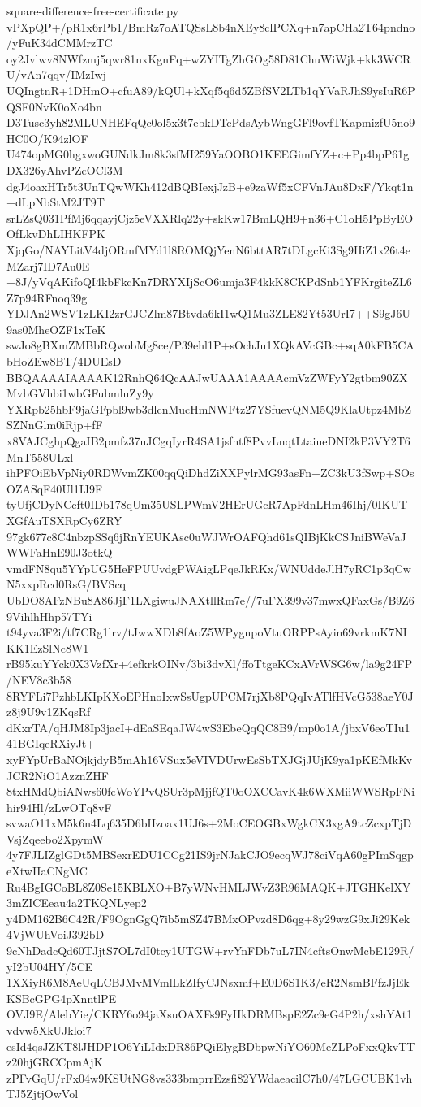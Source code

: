 \documentclass[11pt]{article}
\theoremstyle{definition}
\theoremstyle{remark}
\begin{document}
\begin{filecontents*}[overwrite]{square-difference-free-certificate.py}
vPXpQP+/pR1x6rPb1/BmRz7oATQSsL8b4nXEy8clPCXq+n7apCHa2T64pndno/yFuK34dCMMrzTC
oy2Jvlwv8NWfzmj5qwr81nxKgnFq+wZYITgZhGOg58D81ChuWiWjk+kk3WCRU/vAn7qqv/IMzIwj
UQIngtnR+1DHmO+cfuA89/kQUl+kXqf5q6d5ZBfSV2LTb1qYVaRJhS9ysIuR6PQSF0NvK0oXo4bn
D3Tusc3yh82MLUNHEFqQc0ol5x3t7ebkDTcPdsAybWngGFl9ovfTKapmizfU5no9HC0O/K94zlOF
U474opMG0hgxwoGUNdkJm8k3sfMI259YaOOBO1KEEGimfYZ+c+Pp4bpP61gDX326yAhvPZcOCl3M
dgJ4oaxHTr5t3UnTQwWKh412dBQBIexjJzB+e9zaWf5xCFVnJAu8DxF/Ykqt1n+dLpNbStM2JT9T
srLZsQ031PfMj6qqayjCjz5eVXXRlq22y+skKw17BmLQH9+n36+C1oH5PpByEOOfLkvDhLIHKFPK
XjqGo/NAYLitV4djORmfMYd1l8ROMQjYenN6bttAR7tDLgcKi3Sg9HiZ1x26t4eMZarj7ID7Au0E
+8J/yVqAKifoQI4kbFkcKn7DRYXIjScO6umja3F4kkK8CKPdSnb1YFKrgiteZL6Z7p94RFnoq39g
YDJAn2WSVTzLKI2zrGJCZlm87Btvda6kI1wQ1Mu3ZLE82Yt53UrI7++S9gJ6U9as0MheOZF1xTeK
swJo8gBXmZMBbRQwobMg8ce/P39ehl1P+sOchJu1XQkAVcGBc+sqA0kFB5CAbHoZEw8BT/4DUEsD
BBQAAAAIAAAAK12RnhQ64QcAAJwUAAA1AAAAcmVzZWFyY2gtbm90ZXMvbGVhbi1wbGFubmluZy9y
YXRpb25hbF9jaGFpbl9wb3dlcnMucHmNWFtz27YSfuevQNM5Q9KlaUtpz4MbZSZNnGlm0iRjp+fF
x8VAJCghpQgaIB2pmfz37uJCgqIyrR4SA1jsfntf8PvvLnqtLtaiueDNI2kP3VY2T6MnT558ULxl
ihPFOiEbVpNiy0RDWvmZK00qqQiDhdZiXXPylrMG93asFn+ZC3kU3fSwp+SOsOZASqF40Ul1IJ9F
tyUfjCDyNCcft0IDb178qUm35USLPWmV2HErUGcR7ApFdnLHm46Ihj/0IKUTXGfAuTSXRpCy6ZRY
97gk677c8C4nbzpSSq6jRnYEUKAsc0uWJWrOAFQhd61sQIBjKkCSJniBWeVaJWWFaHnE90J3otkQ
vmdFN8qu5YYpUG5HeFPUUvdgPWAigLPqeJkRKx/WNUddeJlH7yRC1p3qCwN5xxpRcd0RsG/BVScq
UbDO8AFzNBu8A86JjF1LXgiwuJNAXtllRm7e//7uFX399v37mwxQFaxGs/B9Z69VihlhHhp57TYi
t94yva3F2i/tf7CRg1lrv/tJwwXDb8fAoZ5WPygnpoVtuORPPsAyin69vrkmK7NIKK1EzSlNc8W1
rB95kuYYck0X3VzfXr+4efkrkOINv/3bi3dvXl/ffoTtgeKCxAVrWSG6w/la9g24FP/NEV8c3b58
8RYFLi7PzhbLKIpKXoEPHnoIxwSsUgpUPCM7rjXb8PQqIvATlfHVcG538aeY0Jz8j9U9v1ZKqsRf
dKxrTA/qHJM8Ip3jacI+dEaSEqaJW4wS3EbeQqQC8B9/mp0o1A/jbxV6eoTIu141BGIqeRXiyJt+
xyFYpUrBaNOjkjdyB5mAh16VSux5eVIVDUrwEsSbTXJGjJUjK9ya1pKEfMkKvJCR2NiO1AzznZHF
8txHMdQbiANws60fcWoYPvQSUr3pMjjfQT0oOXCCavK4k6WXMiiWWSRpFNihir94Hl/zLwOTq8vF
svwaO11xM5k6n4Lq635D6bHzoax1UJ6s+2MoCEOGBxWgkCX3xgA9tcZcxpTjDVsjZqeebo2XpymW
4y7FJLIZglGDt5MBSexrEDU1CCg21IS9jrNJakCJO9ecqWJ78ciVqA60gPImSqgpeXtwIIaCNgMC
Ru4BgIGCoBL8Z0Se15KBLXO+B7yWNvHMLJWvZ3R96MAQK+JTGHKelXY3mZICEeau4a2TKQNLyep2
y4DM162B6C42R/F9OgnGgQ7ib5mSZ47BMxOPvzd8D6qg+8y29wzG9xJi29Kek4VjWUhVoiJ392bD
9cNhDadcQd60TJjtS7OL7dI0tcy1UTGW+rvYnFDb7uL7IN4cftsOnwMcbE129R/yI2bU04HY/5CE
1XXiyR6M8AeUqLCBJMvMVmlLkZIfyCJNsxmf+E0D6S1K3/eR2NsmBFfzJjEkKSBcGPG4pXnntlPE
OVJ9E/AlebYie/CKRY6o94jaXsuOAXFs9FyHkDRMBspE2Zc9eG4P2h/xshYAt1vdvw5XkUJkloi7
esId4qsJZKT8lJHDP1O6YiLIdxDR86PQiElygBDbpwNiYO60MeZLPoFxxQkvTTz20hjGRCCpmAjK
zPFvGqU/rFx04w9KSUtNG8vs333bmprrEzsfi82YWdaeacilC7h0/47LGCUBK1vhTJ5ZjtjOwVol

\end{filecontents*}
\end{document}
